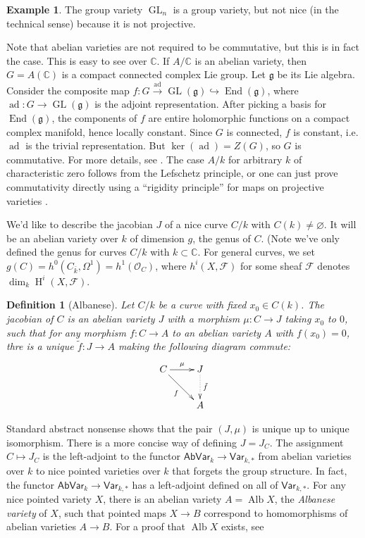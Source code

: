\documentclass{article}
\DeclareMathOperator{\h}{H}
\newtheorem{definition}[subsection]{Definition}
\theoremstyle{definition}
\newtheorem{example}[subsection]{Example}
\begin{document}
\begin{example}
The group variety $\operatorname{GL}_n$ is a group variety, but not nice (in 
the technical sense) because it is not projective.
\end{example}

Note that abelian varieties are not required to be commutative, but this is in 
fact the case. This is easy to see over $\mathbb{C}$. If $A/\mathbb{C}$ is an 
abelian variety, then $G=A(\mathbb{C})$ is a compact connected complex Lie 
group. Let $\mathfrak{g}$ be its Lie algebra. Consider the composite map 
$f:G\xrightarrow{\text{ad}}\operatorname{GL}(\mathfrak{g}) \hookrightarrow 
\operatorname{End}(\mathfrak{g})$, where 
$\operatorname{ad}:G\to\operatorname{GL}(\mathfrak{g})$ is the adjoint 
representation. After picking a basis for $\operatorname{End}(\mathfrak{g})$, 
the components of $f$ are entire holomorphic functions on a compact complex 
manifold, hence locally constant. Since $G$ is connected, $f$ is constant, i.e. 
$\operatorname{ad}$ is the trivial representation. But 
$\ker(\operatorname{ad}) = Z(G)$, so $G$ is commutative. For more details, see 
\cite[I.1]{mu08}. The case $A/k$ for arbitrary $k$ of characteristic zero 
follows from the Lefschetz principle, or one can just prove commutativity 
directly using a ``rigidity principle'' for maps on projective varieties
\cite[I.1.4]{mi}. 

We'd like to describe the jacobian $J$ of a nice curve $C/k$ with 
$C(k)\ne\varnothing$. It will be an abelian variety over $k$ of dimension 
$g$, the genus of $C$. (Note we've only defined the genus for curves 
$C/k$ with $k\subset\mathbb{C}$. For general curves, we set  
$g(C)=h^0(C_{\bar k},\Omega^1) = h^1(\mathscr{O}_C)$, where 
$h^i(X,\mathscr{F})$ for some sheaf $\mathscr{F}$ denotes 
$\dim_k\h^i(X,\mathscr{F})$. 

\begin{definition}[Albanese]
Let $C/k$ be a curve with fixed $x_0\in C(k)$. The \emph{jacobian} of $C$ is 
an abelian variety $J$ with a morphism $\mu:C\to J$ taking $x_0$ to $0$, such 
that for any morphism $f:C\to A$ to an abelian variety $A$ with $f(x_0)=0$, 
thre is a unique $\tilde f:J\to A$ making the following diagram commute:
\[\xymatrix{
  C \ar[r]^-\mu \ar[dr]_-f 
    & J \ar@{.>}[d]^-{\tilde f} \\
  & A
}\]
\end{definition}

Standard abstract nonsense shows that the pair $(J,\mu)$ is unique up to 
unique isomorphism. There is a more concise way of defining $J=J_C$. The 
assignment $C\mapsto J_C$ is the left-adjoint to the functor 
$\mathsf{AbVar}_k\to \mathsf{Var}_{k,*}$ from abelian varieties over $k$ to 
nice pointed varieties over $k$ that forgets the group structure. In fact, the 
functor $\mathsf{AbVar}_k\to\mathsf{Var}_{k,*}$ has a left-adjoint defined 
on all of $\mathsf{Var}_{k,*}$. For any nice pointed variety $X$, there is an 
abelian variety $A=\operatorname{Alb} X$, the \emph{Albanese variety} of $X$, 
such that pointed maps $X\to B$ correspond to homomorphisms of abelian 
varieties $A\to B$. For a proof that $\operatorname{Alb} X$ exists, see 
\cite[A.11]{mo12}
\end{document}
